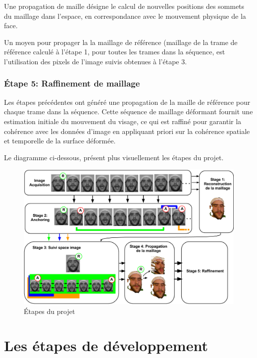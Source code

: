 \documentclass[a4paper,12pt]{article}
\begin{document}
Une propagation de maille désigne le calcul de nouvelles positions des
sommets du maillage dans l'espace, en correspondance avec le mouvement
physique de la face.

Un moyen pour propager la la maillage de référence (maillage de la
trame de référence calculé à l'étape 1, pour toutes les trames dans
la séquence, est l'utilisation des pixels de l'image suivis obtenues à
l'étape 3.
 
\subsubsection*{Étape 5: Raffinement de maillage}

Les étapes précédentes ont généré une propagation de la maille de
référence pour chaque trame dans la séquence. Cette séquence de
maillage déformant fournit une estimation initiale du mouvement du
visage, ce qui est raffiné pour garantir la cohérence avec les données
d'image en appliquant priori sur la cohérence spatiale et temporelle
de la surface déformée.

Le diagramme ci-dessous, présent plus visuellement les étapes du projet.

\begin{figure}[ht!]
  \begin{center}
    \includegraphics[scale=0.4]{img/projDiagram.png}
    \caption{Étapes du projet}
  \end{center}
\end{figure}




\newpage
\section{Les étapes de développement}
\end{document}
